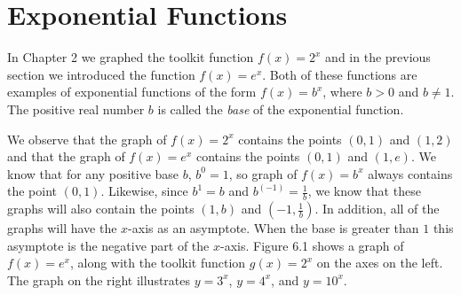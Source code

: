 \documentclass[10pt,]{book}
\theoremstyle{plain}
\theoremstyle{definition}
\theoremstyle{definition}
\theoremstyle{definition}
\numberwithin{equation}{section}
\newcommand{\gt}{>}
\begin{document}
\section[{Exponential Functions}]{Exponential Functions}\label{chapter04-section06}
\hypertarget{p-232}{}%
In Chapter 2 we graphed the toolkit function \(f(x)=2^x\) and in the previous section we introduced the function  \(f(x)=e^x\).  Both of these functions are examples of exponential functions of the form  \(f(x)=b^x\), where  \(b \gt 0\) and \(b \neq 1\).  The positive real number \(b\) is called the \emph{base} of the exponential function.%
\par
\hypertarget{p-233}{}%
We observe that the graph of \(f(x)=2^x\)  contains the points \((0,1)\) and \((1,2)\) and that the graph of \(f(x)=e^x\) contains the points \((0,1)\) and \((1,e)\).  We know that for any positive base \(b\), \(b^0=1\), so graph of \(f(x)=b^x\) always contains the point \((0,1)\). Likewise, since \(b^1=b\) and \(b^(-1)=\frac{1}{b}\), we know that these graphs will also contain the points \((1,b)\) and \((-1,\frac{1}{b})\). In addition, all of the graphs will have the \(x\)-axis as an asymptote.  When the base is greater than \(1\) this asymptote is the negative part of the \(x\)-axis. Figure 6.1 shows a graph of \(f(x)=e^x\), along with the toolkit function \(g(x)=2^x\) on the axes on the left. The graph on the right illustrates \(y=3^x\), \(y=4^x\), and \(y=10^x\).%
\end{document}
